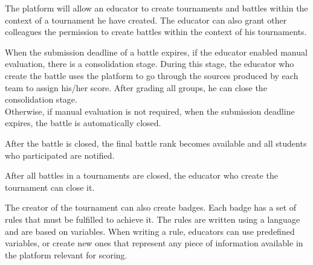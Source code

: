 The platform will allow an educator to create tournaments and battles within the context of a tournament he have created.
The educator can also grant other colleagues the permission to create battles within the context of his tournaments.

When the submission deadline of a battle expires, if the educator enabled manual evaluation, there is a consolidation stage.
During this stage, the educator who create the battle uses the platform to go through the sources produced by each team to assign his/her score.
After grading all groups, he can close the consolidation stage.\\
Otherwise, if manual evaluation is not required, when the submission deadline expires, the battle is automatically closed.

After the battle is closed, the final battle rank becomes available and all students who participated are notified.

After all battles in a tournaments are closed, the educator who create the tournament can close it.

The creator of the tournament can also create badges.
Each badge has a set of rules that must be fulfilled to achieve it.
The rules are written using a language  and are based on variables.
When writing a rule, educators can use predefined variables, or create new ones that represent any piece of information available in the platform relevant for scoring.

